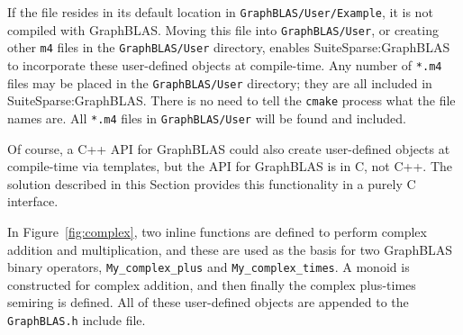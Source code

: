 \documentclass[12pt]{article}
\begin{document}
If the file resides in its default location in \verb'GraphBLAS/User/Example',
it is not compiled with GraphBLAS.  Moving this file into
\verb'GraphBLAS/User', or creating other \verb'm4' files in the
\verb'GraphBLAS/User' directory, enables SuiteSparse:GraphBLAS to incorporate
these user-defined objects at compile-time.  Any number of \verb'*.m4' files
may be placed in the \verb'GraphBLAS/User' directory; they are all included in
SuiteSparse:GraphBLAS.  There is no need to tell the \verb'cmake' process what
the file names are.  All \verb'*.m4' files in \verb'GraphBLAS/User' will be
found and included.

Of course, a C++ API for GraphBLAS could also create user-defined objects at
compile-time via templates, but the API for GraphBLAS is in C, not C++.  The
solution described in this Section provides this functionality in a purely C
interface.

In Figure~\ref{fig:complex}, two inline functions are defined to perform
complex addition and multiplication, and these are used as the basis for two
GraphBLAS binary operators, \verb'My_complex_plus' and \verb'My_complex_times'.
A monoid is constructed for complex addition, and then finally the complex
plus-times semiring is defined.  All of these user-defined objects are appended
to the \verb'GraphBLAS.h' include file.
\end{document}
